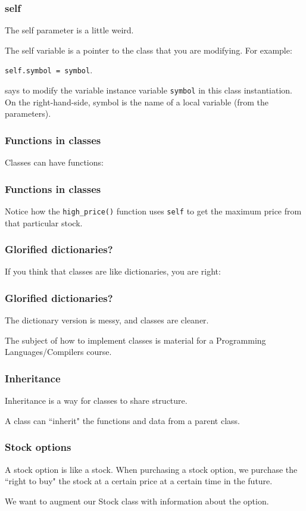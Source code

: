 \documentclass{beamer}
\begin{document}
\begin{frame}
\frametitle{self}
The self parameter is a little weird.

\vspace{0.2in}

The self variable is a pointer to the class that you are modifying.  For example:

\begin{center}
\texttt{self.symbol = symbol}.
\end{center}

says to modify the variable instance variable \texttt{symbol} in this class instantiation.  On the right-hand-side, symbol is the name of a local variable (from the parameters).

\end{frame}

\begin{frame}
\frametitle{Functions in classes}
Classes can have functions:

\end{frame}


\begin{frame}
\frametitle{Functions in classes}
Notice how the \texttt{high\_price()} function uses \texttt{self} to get the maximum price from that particular stock.
\end{frame}


\begin{frame}
\frametitle{Glorified dictionaries?}
If you think that classes are like dictionaries, you are right:
\end{frame}

\begin{frame}
\frametitle{Glorified dictionaries?}
The dictionary version is messy, and classes are cleaner.

\vspace{0.2in}

The subject of how to implement classes is material for a Programming Languages/Compilers course.
\end{frame}

\begin{frame}
\frametitle{Inheritance}
Inheritance is a way for classes to share structure.

\vspace{0.2in}
A class can ``inherit" the functions and data from a parent class.
\end{frame}

\begin{frame}
\frametitle{Stock options}
A stock option is like a stock.  When purchasing a stock option, we purchase the ``right to buy" the stock at a certain price at a certain time in the future.

\vspace{0.2in}
We want to augment our Stock class with information about the option.
\end{frame}
\end{document}
